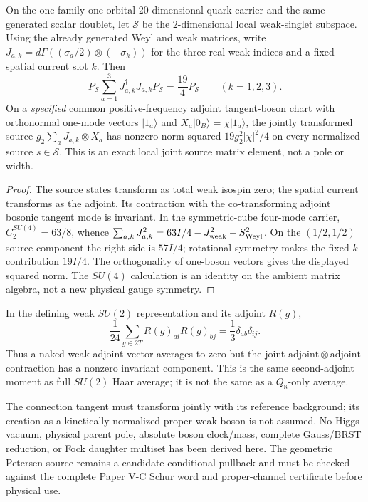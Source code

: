 \documentclass[12pt,a4paper]{article}
\begin{document}
\begin{proposition}
\label{p5c:prop:v368-joint-spatial-current}
On the one-family one-orbital \(20\)-dimensional quark carrier and the
same generated scalar doublet, let \(\mathcal S\) be the \(2\)-dimensional
local weak-singlet subspace. Using the already generated Weyl and weak
matrices, write \(J_{a,k}=d\Gamma((\sigma_a/2)\otimes(-\sigma_k))\)
for the three real weak indices and a fixed spatial current slot \(k\).
Then
\[
P_{\mathcal S}\sum_{a=1}^3 J_{a,k}^{\dagger}J_{a,k}P_{\mathcal S}
=\frac{19}{4}P_{\mathcal S}\qquad(k=1,2,3).
\]
On a \emph{specified} common positive-frequency adjoint tangent-boson chart
with orthonormal one-mode vectors \(|1_a\rangle\) and
\(X_a|0_B\rangle=\chi|1_a\rangle\), the jointly transformed source
\(g_2\sum_a J_{a,k}\otimes X_a\) has nonzero norm squared
\(19g_2^2|\chi|^2/4\) on every normalized source \(s\in\mathcal S\).
This is an exact local joint source matrix element, not a pole or width.
\end{proposition}
\begin{proof}
The source states transform as total weak isospin zero; the spatial current
transforms as the adjoint. Its contraction with the co-transforming adjoint
bosonic tangent mode is invariant. In the symmetric-cube four-mode carrier,
\(C_2^{SU(4)}=63/8\), whence
\(
\sum_{a,k}J_{a,k}^2=63I/4-J_{\rm weak}^2-S_{\rm Weyl}^2
\).
On the \((1/2,1/2)\) source component the right side is \(57I/4\);
rotational symmetry makes the fixed-\(k\) contribution \(19I/4\).
The orthogonality of one-boson vectors gives the displayed squared norm.
The \(SU(4)\) calculation is an identity on the ambient matrix algebra,
not a new physical gauge symmetry.
\end{proof}
\begin{lemma}
\label{p5c:lem:v368-Hurwitz-joint-Reynolds}
In the defining weak \(SU(2)\) representation and its adjoint \(R(g)\),
\[
\frac1{24}\sum_{g\in2T}R(g)_{ai}R(g)_{bj}
=\frac13\delta_{ab}\delta_{ij}.
\]
Thus a naked weak-adjoint vector averages to zero but the joint
\(\mathrm{adjoint}\otimes\mathrm{adjoint}\) contraction has a nonzero
invariant component. This is the same second-adjoint moment as full
\(SU(2)\) Haar average; it is not the same as a \(Q_8\)-only average.
\end{lemma}
\begin{remark}
The connection tangent must transform jointly with its reference background;
its creation as a kinetically normalized proper weak boson is not assumed.
No Higgs vacuum, physical parent pole, absolute boson clock/mass, complete
Gauss/BRST reduction, or Fock daughter multiset has been derived here.
The geometric Petersen source remains a candidate conditional pullback
and must be checked against the complete Paper V-C Schur word and
proper-channel certificate before physical use.
\end{remark}
\end{document}
